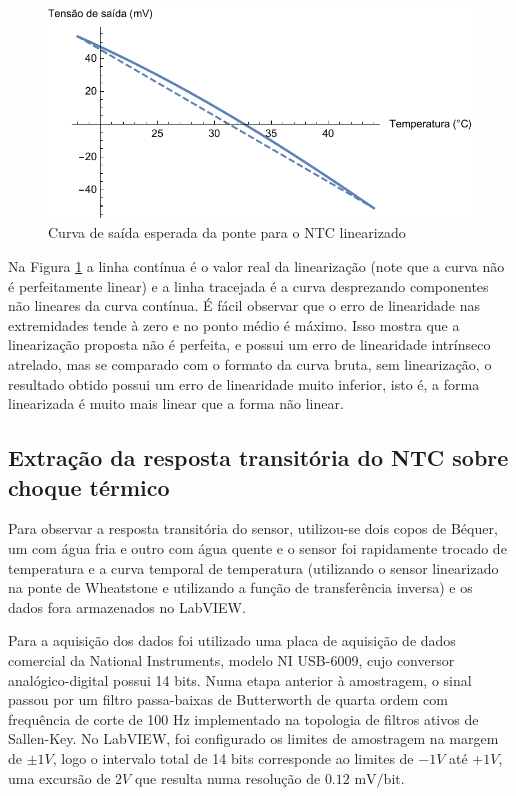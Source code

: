 \documentclass[a4paper]{instrumentacao}
\begin{document}
\begin{figure}[H]
\center
\includegraphics[width=\textwidth]{NTC-Linear-Esperado.pdf}
\caption{Curva de saída esperada da ponte para o NTC linearizado}
\label{fig:ntc-linear-esperado}
\end{figure}

Na Figura \ref{fig:ntc-linear-esperado} a linha contínua é o valor real da linearização (note que a curva não é perfeitamente linear) e a linha tracejada é a curva desprezando componentes não lineares da curva contínua. É fácil observar que o erro de linearidade nas extremidades tende à zero e no ponto médio é máximo. Isso mostra que a linearização proposta não é perfeita, e possui um erro de linearidade intrínseco atrelado, mas se comparado com o formato da curva bruta, sem linearização, o resultado obtido possui um erro de linearidade muito inferior, isto é, a forma linearizada é muito mais linear que a forma não linear.

\subsection{Extração da resposta transitória do NTC sobre choque térmico}
Para observar a resposta transitória do sensor, utilizou-se dois copos de Béquer, um com água fria e outro com água quente e o sensor foi rapidamente trocado de temperatura e a curva temporal de temperatura (utilizando o sensor linearizado na ponte de Wheatstone e utilizando a função de transferência inversa) e os dados fora armazenados no LabVIEW.

Para a aquisição dos dados foi utilizado uma placa de aquisição de dados comercial da National Instruments, modelo NI USB-6009, cujo conversor analógico-digital possui 14 bits\cite{daq-specifications}. Numa etapa anterior à amostragem, o sinal passou por um filtro passa-baixas de Butterworth de quarta ordem com frequência de corte de 100 Hz implementado na topologia de filtros ativos de Sallen-Key. No LabVIEW, foi configurado os limites de amostragem na margem de $\pm 1V$, logo o intervalo total de 14 bits corresponde ao limites de $-1V$ até $+1V$, uma excursão de $2V$ que resulta numa resolução de $0.12\text{ mV/bit}$.
\end{document}
